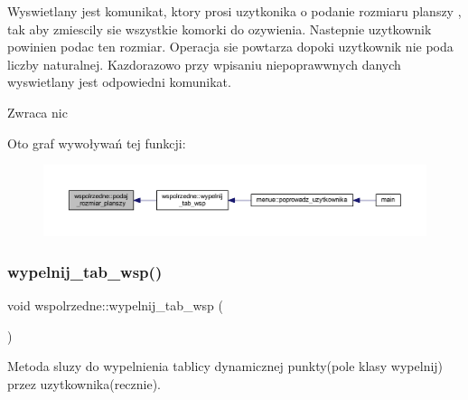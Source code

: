 Wyswietlany jest komunikat, ktory prosi uzytkonika o podanie rozmiaru planszy , tak aby zmiescily sie wszystkie komorki do ozywienia. Nastepnie uzytkownik powinien podac ten rozmiar. Operacja sie powtarza dopoki uzytkownik nie poda liczby naturalnej. Kazdorazowo przy wpisaniu niepoprawwnych danych wyswietlany jest odpowiedni komunikat. \begin{DoxyReturn}{Zwraca}
nic 
\end{DoxyReturn}
Oto graf wywoływań tej funkcji\+:
\nopagebreak
\begin{figure}[H]
\begin{center}
\leavevmode
\includegraphics[width=350pt]{classwspolrzedne_a38c1a6012fac2575a2446ab094186114_icgraph}
\end{center}
\end{figure}
\mbox{\label{classwspolrzedne_a9995d04ed35891918459a091284fa76f}} 
\subsubsection{\texorpdfstring{wypelnij\+\_\+tab\+\_\+wsp()}{wypelnij\_tab\_wsp()}}
{\footnotesize\ttfamily void wspolrzedne\+::wypelnij\+\_\+tab\+\_\+wsp (\begin{DoxyParamCaption}{ }\end{DoxyParamCaption})}

Metoda sluzy do wypelnienia tablicy dynamicznej punkty(pole klasy wypelnij) przez uzytkownika(recznie).

